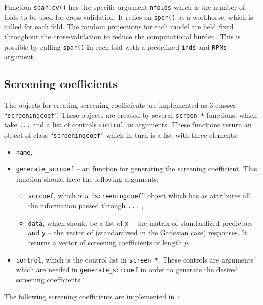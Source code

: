 \documentclass[
  article]{jss}
\providecommand{\tightlist}{%
  \setlength{\itemsep}{0pt}\setlength{\parskip}{0pt}}\usepackage{longtable,booktabs,array}
\begin{document}
Function \texttt{spar.cv()} has the specific argument \texttt{nfolds}
which is the number of folds to be used for cross-validation. It relies
on \texttt{spar()} as a workhorse, which is called for each fold. The
random projections for each model are held fixed throughout the
cross-validation to reduce the computational burden. This is possible by
calling \texttt{spar()} in each fold with a predefined \texttt{inds} and
\texttt{RPMs} argument.

\subsection{Screening coefficients}\label{screening-coefficients}

The objects for creating screening coefficients are implemented as
3 classes ``\texttt{screeningcoef}''. These objects are
created by several \texttt{screen\_*} functions, which take \texttt{...}
and a list of controls \texttt{control} as arguments. These functions
return an object of class ``\texttt{screeningcoef}'' which in turn is a
list with three elements:

\begin{itemize}
\item
  \texttt{name},
\item
  \texttt{generate\_scrcoef} -- an  function for generating
  the screening coefficient. This function should have the following
  arguments:

  \begin{itemize}
  \tightlist
  \item
    \texttt{scrcoef}, which is a ``\texttt{screeningcoef}'' object which
    has as attributes all the information passed through \texttt{...}
    ,\\
  \item
    \texttt{data}, which should be a list of \texttt{x} -- the matrix of
    standardized predictors -- and \texttt{y} -- the vector of
    (standardized in the Gaussian case) responses. It returns a vector
    of screening coefficients of length \(p\).
  \end{itemize}
\item
  \texttt{control}, which is the control list in \texttt{screen\_*}.
  These controls are arguments which are needed in
  \texttt{generate\_scrcoef} in order to generate the desired screening
  coefficients.
\end{itemize}

The following screening coefficients are implemented in :
\end{document}
